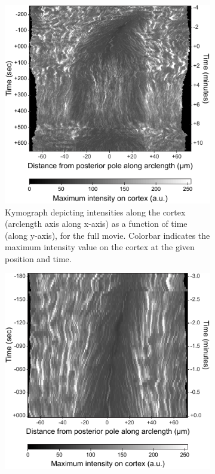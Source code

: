 \begin{figure}[p]
\centering

\begin{subfigure}[t]{0.45\textwidth}
    \centering
    \includegraphics[width=\textwidth]{ExpMethods/FigCrtxFlows/kymographFullMovie.pdf}
    \caption{Kymograph depicting intensities along the cortex (arclength axis along x-axis) as a function of time (along y-axis), for the full movie. Colorbar indicates the maximum intensity value on the cortex at the given position and time.} 
    \label{subfig:crtxFlowMeasurement-kymographFullMovie}
\end{subfigure}
\hfill
\begin{subfigure}[t]{0.45\textwidth}
    \centering
    \includegraphics[width=\textwidth]{ExpMethods/FigCrtxFlows/kymographPosteriorization.pdf}

\end{subfigure}
\end{figure}
